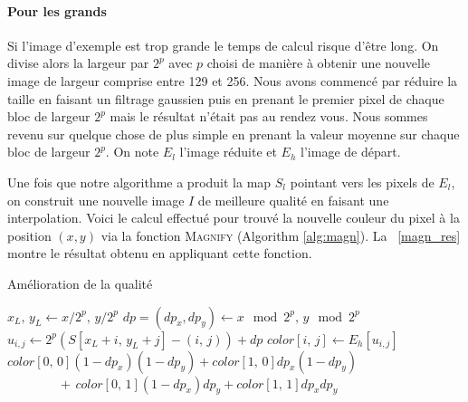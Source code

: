 \documentclass[12pt]{article}
\begin{document}
\paragraph{Pour les grands}

Si l'image d'exemple est trop grande le temps de calcul risque d'être long. On divise alors la largeur par $2^p$ avec $p$ choisi de manière à obtenir une nouvelle image de largeur comprise entre 129 et 256. Nous avons commencé par réduire la taille en faisant un filtrage gaussien puis en prenant le premier pixel de chaque bloc de largeur $2^p$ mais le résultat n'était pas au rendez vous. Nous sommes revenu sur quelque chose de plus simple en prenant la valeur moyenne sur chaque bloc de largeur $2^p$. On note $E_l$ l'image réduite et $E_h$ l'image de départ.

Une fois que notre algorithme a produit la map $S_l$ pointant vers les pixels de $E_l$, on construit une nouvelle image $I$ de meilleure qualité en faisant une interpolation. Voici le calcul effectué pour trouvé la nouvelle couleur du pixel à la position $(x, y)$ via la fonction \textsc{Magnify} (Algorithm \ref{alg:magn}). La \figurename~\ref{magn_res} montre le résultat obtenu en appliquant cette fonction.

\begin{algorithm}
	\caption{Amélioration de la qualité}
	\label{alg:magn}
	\begin{algorithmic}
			\State $x_L, \, y_L \gets x / 2^p, \, y / 2^p$
			\State $dp = (dp_x, dp_y) \gets x \mod 2^p, \, y \mod 2^p$
				\State $u_{i, j} \gets 2^p \left( S \left[ x_L + i, \, y_L + j \right] - \left( i, \, j \right) \right) + dp$
				\State $color \left[ i, \, j \right] \gets E_h \left[ u_{i, j} \right]$
			\EndFor
			\State \Return $color \left[ 0, \, 0 \right] (1 - dp_x) (1 - dp_y)
						+ color \left[ 1, \, 0 \right] dp_x (1 - dp_y)$
			\State $\qquad \qquad + \, color \left[ 0, \, 1 \right] (1 - dp_x) dp_y
						+ color \left[ 1, \, 1 \right] dp_x dp_y$
		\EndFunction
	\end{algorithmic}
\end{algorithm}
\end{document}
